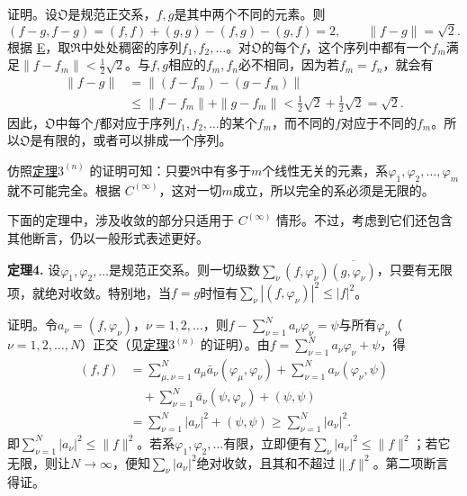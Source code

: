 \documentclass[fontsize=13pt,twoside,openany,headings=normal,parskip=false,bookmarkpackage=false,DIV=calc]{scrbook}
\newcommand{\textkaishu}[1]{{\zhkaishu #1}}
\begin{document}
\textkaishu{证明。}设$\mathfrak{O}$是规范正交系，$f,\allowbreak g$是其中两个不同的元素。则
\[
(f-g,f-g)=(f,f)+(g,g)-(f,g)-(g,f)=2,
\qquad \|f-g\|=\sqrt2.
\]
根据 \hyperref[ax:II.E]{E}，取$\mathfrak{R}$中处处稠密的序列$f_1,\allowbreak f_2,\allowbreak \ldots$。对$\mathfrak{O}$的每个$f$，这个序列中都有一个$f_m$满足$\|f-f_m\|<\frac12\sqrt2$。与$f,\allowbreak g$相应的$f_m,\allowbreak f_n$必不相同，因为若$f_m=f_n$，就会有
\begin{align*}
\|f-g\|&=\|(f-f_m)-(g-f_m)\|\\
&\leq\|f-f_m\|+\|g-f_m\|
<\tfrac12\sqrt2+\tfrac12\sqrt2=\sqrt2.
\end{align*}
因此，$\mathfrak{O}$中每个$f$都对应于序列$f_1,\allowbreak f_2,\allowbreak \ldots$的某个$f_m$，而不同的$f$对应于不同的$f_m$。所以$\mathfrak{O}$是有限的，或者可以排成一个序列。

仿照\CJKglue \hyperref[thm:II.3n]{定理$3^{(n)}$} 的证明可知：只要$\mathfrak{R}$中有多于$m$个线性无关的元素，系$\varphi_1,\allowbreak \varphi_2,\allowbreak \ldots,\allowbreak \varphi_m$就不可能完全。根据 \hyperref[ax:II.Cinfty]{$C^{(\infty)}$}，这对一切$m$成立，所以完全的系必须是无限的。

下面的定理中，涉及收敛的部分只适用于 \hyperref[ax:II.Cinfty]{$C^{(\infty)}$} 情形。不过，考虑到它们还包含其他断言，仍以一般形式表述更好。

\leavevmode{}\textbf{定理4.}\label{thm:II.4} 设$\varphi_1,\allowbreak \varphi_2,\allowbreak \ldots$是规范正交系。则一切级数$\sum_\nu(f,\allowbreak \varphi_\nu)\overline{(g,\allowbreak \varphi_\nu)}$，只要有无限项，就绝对收敛。特别地，当$f=g$时恒有$\sum_\nu|(f,\allowbreak \varphi_\nu)|^2\leq|f|^2$。

\textkaishu{证明。}令$a_\nu=(f,\allowbreak \varphi_\nu)$，$\nu=1,\allowbreak 2,\allowbreak \ldots$，则$f-\sum_{\nu=1}^Na_\nu\varphi_\nu=\psi$与所有$\varphi_\nu$（$\nu=1,\allowbreak 2,\allowbreak \ldots,\allowbreak N$）正交（见\CJKglue \hyperref[thm:II.3n]{定理$3^{(n)}$} 的证明）。\hypertarget{origpage-27}{}\label{origpage-27}由$f=\sum_{\nu=1}^Na_\nu\varphi_\nu+\psi$，得
\begin{align*}
(f,f)&=\sum_{\mu,\nu=1}^Na_\mu\bar a_\nu(\varphi_\mu,\varphi_\nu)
+\sum_{\nu=1}^Na_\nu(\varphi_\nu,\psi)\\
&\quad+\sum_{\nu=1}^N\bar a_\nu(\psi,\varphi_\nu)+(\psi,\psi)\\
&=\sum_{\nu=1}^N|a_\nu|^2+(\psi,\psi)
\geq\sum_{\nu=1}^N|a_\nu|^2.
\end{align*}
即$\sum_{\nu=1}^N|a_\nu|^2\leq\|f\|^2$。若系$\varphi_1,\allowbreak \varphi_2,\allowbreak \ldots$有限，立即便有$\sum_\nu|a_\nu|^2\leq\|f\|^2$；若它无限，则让$N\to\infty$，便知$\sum_\nu|a_\nu|^2$绝对收敛，且其和不超过$\|f\|^2$。第二项断言得证。
\end{document}
